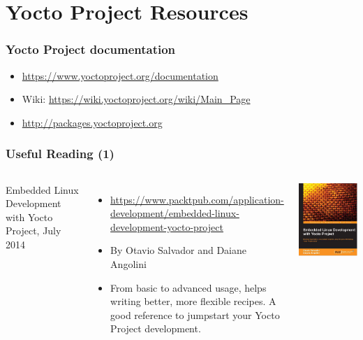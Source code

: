 \section{Yocto Project Resources}

\begin{frame}
  \frametitle{Yocto Project documentation}
  \begin{itemize}
  \item \url{https://www.yoctoproject.org/documentation}
  \item Wiki: \url{https://wiki.yoctoproject.org/wiki/Main_Page}
  \item \url{http://packages.yoctoproject.org}
  \end{itemize}
\end{frame}

\begin{frame}
  \frametitle{Useful Reading (1)}
  \begin{columns}
    Embedded Linux Development with Yocto Project, July 2014
    \begin{itemize}
    \item \url{https://www.packtpub.com/application-development/embedded-linux-development-yocto-project}
    \item By Otavio Salvador and Daiane Angolini
    \item From basic to advanced usage, helps writing better, more
      flexible recipes. A good reference to jumpstart your Yocto
      Project development.
    \end{itemize}
    \includegraphics[width=\textwidth]{slides/yocto-resources/ELDYP.jpg}
  \end{columns}
\end{frame}

